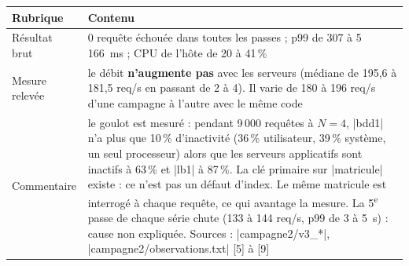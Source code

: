\documentclass[a4paper,11pt]{article}
\begin{document}
{\small
\begin{longtable}{@{}L{3.2cm}L{12.4cm}@{}}
\toprule
\textbf{Rubrique} & \textbf{Contenu}\\ \midrule\endhead
Résultat brut & 0 requête échouée dans toutes les passes ; p99 de 307 à 5\,166~ms ; CPU de l'hôte de 20 à 41\,\%\\
Mesure relevée & le débit \textbf{n'augmente pas} avec les serveurs (médiane de 195,6 à 181,5 req/s en passant de 2 à 4). Il varie de 180 à 196 req/s d'une campagne à l'autre avec le même code\\
Commentaire & le goulot est mesuré : pendant 9\,000 requêtes à $N=4$, |bdd1| n'a plus que 10\,\% d'inactivité (36\,\% utilisateur, 39\,\% système, un seul processeur) alors que les serveurs applicatifs sont inactifs à 63\,\% et |lb1| à 87\,\%. La clé primaire sur |matricule| existe : ce n'est pas un défaut d'index. Le même matricule est interrogé à chaque requête, ce qui avantage la mesure. La 5\textsuperscript{e} passe de chaque série chute (133 à 144 req/s, p99 de 3 à 5~s) : cause non expliquée. Sources : |campagne2/v3_*|, |campagne2/observations.txt| [5] à [9]\\
\bottomrule
\end{longtable}}

\end{document}
